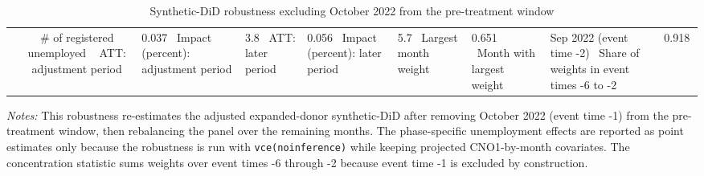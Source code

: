 \begin{table}[!htbp]
\centering
\caption{Synthetic-DiD robustness excluding October 2022 from the pre-treatment window}
\label{tab:v1_sdid_drop_last_pre}
\begin{threeparttable}
\small
\begin{tabular}{lc}
\toprule
& \# of registered unemployed \
\midrule
ATT: adjustment period & 0.037 \
Impact (percent): adjustment period & 3.8 \
ATT: later period & 0.056 \
Impact (percent): later period & 5.7 \
Largest month weight & 0.651 \
Month with largest weight & Sep 2022 (event time -2) \
Share of weights in event times -6 to -2 & 0.918 \
\bottomrule
\end{tabular}
\begin{tablenotes}[flushleft]
\footnotesize
\item \emph{Notes:} This robustness re-estimates the adjusted expanded-donor synthetic-DiD after removing October 2022 (event time -1) from the pre-treatment window, then rebalancing the panel over the remaining months. The phase-specific unemployment effects are reported as point estimates only because the robustness is run with \texttt{vce(noinference)} while keeping projected CNO1-by-month covariates. The concentration statistic sums weights over event times -6 through -2 because event time -1 is excluded by construction.
\end{tablenotes}
\end{threeparttable}
\end{table}
